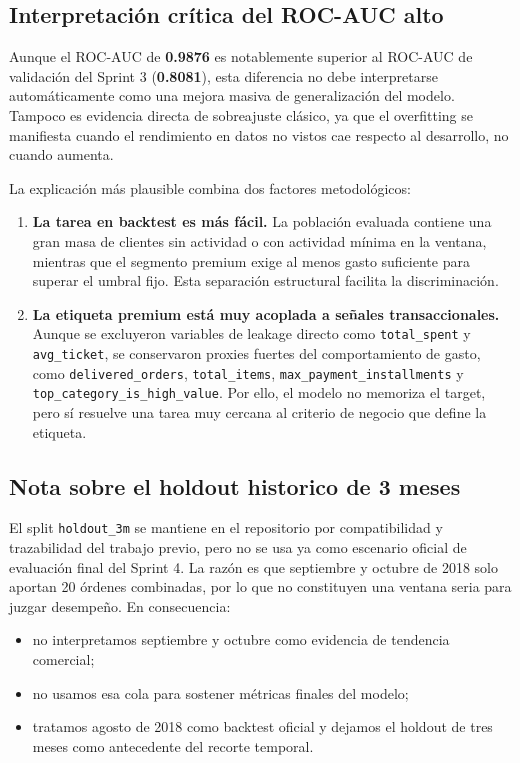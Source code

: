 \documentclass[journal,letterpaper]{IEEEtran}
\begin{document}
\subsection{Interpretación crítica del ROC-AUC alto}
Aunque el ROC-AUC de \textbf{0.9876} es notablemente superior al ROC-AUC de validación del Sprint 3 (\textbf{0.8081}), esta diferencia no debe interpretarse automáticamente como una mejora masiva de generalización del modelo. Tampoco es evidencia directa de sobreajuste clásico, ya que el overfitting se manifiesta cuando el rendimiento en datos no vistos cae respecto al desarrollo, no cuando aumenta.

La explicación más plausible combina dos factores metodológicos:
\begin{enumerate}
    \item \textbf{La tarea en backtest es más fácil.} La población evaluada contiene una gran masa de clientes sin actividad o con actividad mínima en la ventana, mientras que el segmento premium exige al menos gasto suficiente para superar el umbral fijo. Esta separación estructural facilita la discriminación.
    \item \textbf{La etiqueta premium está muy acoplada a señales transaccionales.} Aunque se excluyeron variables de leakage directo como \texttt{total\_spent} y \texttt{avg\_ticket}, se conservaron proxies fuertes del comportamiento de gasto, como \texttt{delivered\_orders}, \texttt{total\_items}, \texttt{max\_payment\_installments} y \texttt{top\_category\_is\_high\_value}. Por ello, el modelo no memoriza el target, pero sí resuelve una tarea muy cercana al criterio de negocio que define la etiqueta.
\end{enumerate}

\subsection{Nota sobre el holdout historico de 3 meses}
El split \texttt{holdout\_3m} se mantiene en el repositorio por compatibilidad y trazabilidad del trabajo previo, pero no se usa ya como escenario oficial de evaluación final del Sprint 4. La razón es que septiembre y octubre de 2018 solo aportan 20 órdenes combinadas, por lo que no constituyen una ventana seria para juzgar desempeño. En consecuencia:
\begin{itemize}
    \item no interpretamos septiembre y octubre como evidencia de tendencia comercial;
    \item no usamos esa cola para sostener métricas finales del modelo;
    \item tratamos agosto de 2018 como backtest oficial y dejamos el holdout de tres meses como antecedente del recorte temporal.
\end{itemize}
\end{document}
